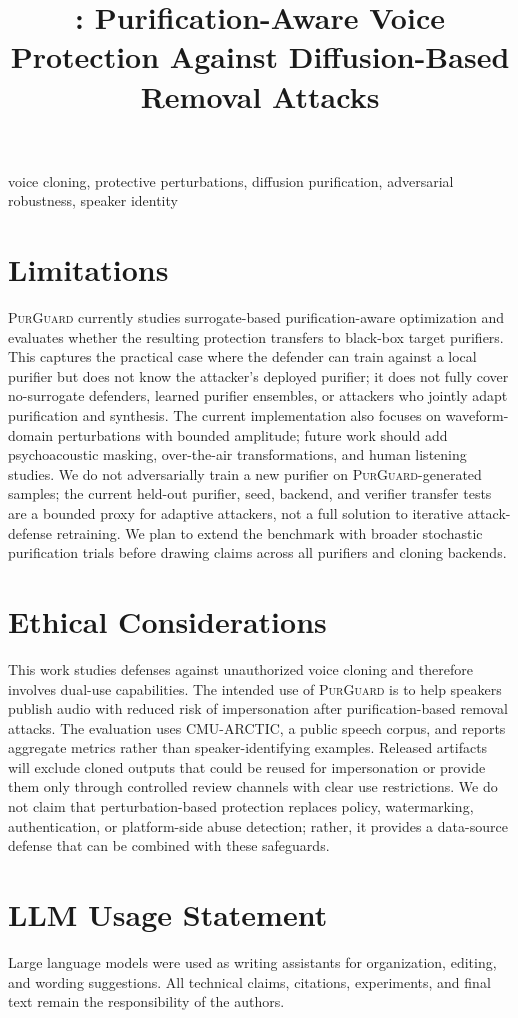 \documentclass[conference,compsoc]{IEEEtran}
\title{\method: Purification-Aware Voice Protection Against Diffusion-Based Removal Attacks}
\author{\IEEEauthorblockN{Anonymous Authors}}
\newcommand{\method}{\textsc{PurGuard}}
\begin{document}
\maketitle



\begin{IEEEkeywords}
voice cloning, protective perturbations, diffusion purification, adversarial robustness, speaker identity
\end{IEEEkeywords}






\section{Limitations}
\label{sec:limitations}
\method{} currently studies surrogate-based purification-aware optimization and evaluates whether the resulting protection transfers to black-box target purifiers. 
This captures the practical case where the defender can train against a local purifier but does not know the attacker's deployed purifier; it does not fully cover no-surrogate defenders, learned purifier ensembles, or attackers who jointly adapt purification and synthesis. 
The current implementation also focuses on waveform-domain perturbations with bounded amplitude; future work should add psychoacoustic masking, over-the-air transformations, and human listening studies. 
We do not adversarially train a new purifier on \method-generated samples; the current held-out purifier, seed, backend, and verifier transfer tests are a bounded proxy for adaptive attackers, not a full solution to iterative attack-defense retraining.
We plan to extend the benchmark with broader stochastic purification trials before drawing claims across all purifiers and cloning backends.



\section{Ethical Considerations}
This work studies defenses against unauthorized voice cloning and therefore involves dual-use capabilities. The intended use of \method{} is to help speakers publish audio with reduced risk of impersonation after purification-based removal attacks. 
The evaluation uses CMU-ARCTIC, a public speech corpus, and reports aggregate metrics rather than speaker-identifying examples. 
Released artifacts will exclude cloned outputs that could be reused for impersonation or provide them only through controlled review channels with clear use restrictions. 
We do not claim that perturbation-based protection replaces policy, watermarking, authentication, or platform-side abuse detection; 
rather, it provides a data-source defense that can be combined with these safeguards.

\section{LLM Usage Statement}
Large language models were used as writing assistants for organization, editing, and wording suggestions. 
All technical claims, citations, experiments, and final text remain the responsibility of the authors.



\end{document}
